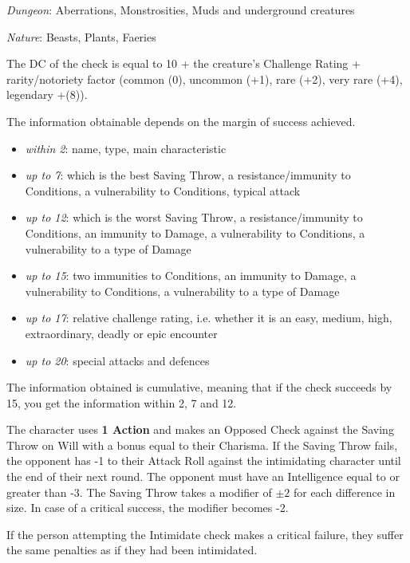 \documentclass[landscape,10pt,a4paper]{article}
\begin{document}
\begin{multicols}{3}
\begin{dmbox}[title=Recognising monsters - page \pageref{recognisingmonsters}]
\emph{Dungeon}: Aberrations, Monstrosities, Muds and underground creatures

\emph{Nature}: Beasts, Plants, Faeries

\medskip

The DC of the check is equal to 10 + the creature's Challenge Rating + rarity/notoriety factor (common (0), uncommon (+1), rare (+2), very rare (+4), legendary +(8)).

The information obtainable depends on the margin of success achieved.

\noindent\begin{itemize}\setlength{\itemsep}{0pt}
\item \emph{within 2}: name, type, main characteristic
\item \emph{up to 7}: which is the best Saving Throw, a resistance/immunity to Conditions, a vulnerability to Conditions, typical attack
\item \emph{up to 12}: which is the worst Saving Throw, a resistance/immunity to Conditions, an immunity to Damage, a vulnerability to Conditions, a vulnerability to a type of Damage
\item \emph{up to 15}: two immunities to Conditions, an immunity to Damage, a vulnerability to Conditions, a vulnerability to a type of Damage
\item \emph{up to 17}: relative challenge rating, i.e. whether it is an easy, medium, high, extraordinary, deadly or epic encounter
\item \emph{up to 20}: special attacks and defences
\end{itemize}

\medskip

The information obtained is cumulative, meaning that if the check succeeds by 15, you get the information within 2, 7 and 12.
\end{dmbox}


\begin{dmbox}[title=Intimidate - page \pageref{intimidate}]
The character uses \textbf{1 Action} and makes an Opposed Check against the Saving Throw on Will with a bonus equal to their Charisma.
If the Saving Throw fails, the opponent has -1 to their Attack Roll against the intimidating character until the end of their next round. The opponent must have an Intelligence equal to or greater than -3. The Saving Throw takes a modifier of $\pm2$ for each difference in size. In case of a critical success, the modifier becomes -2.

If the person attempting the Intimidate check makes a critical failure, they suffer the same penalties as if they had been intimidated.
\end{dmbox}



\end{multicols}
\end{document}
